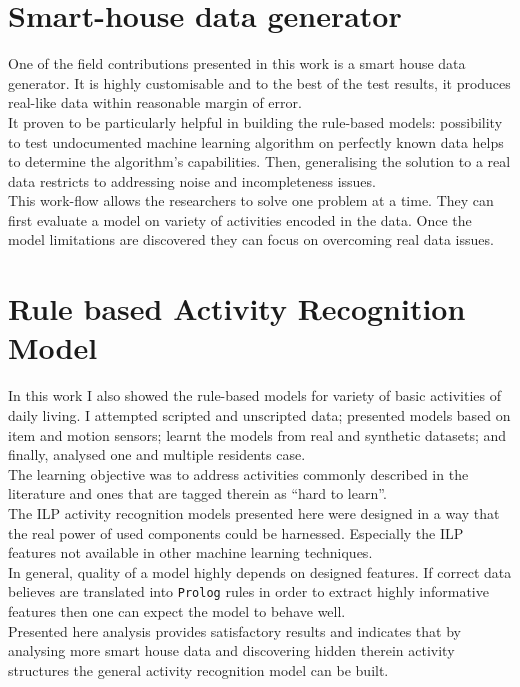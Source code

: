 \documentclass[10pt, a4paper, pdflatex, leqno, twoside, openright]{report}
\begin{document}
  \section{Smart-house data generator} %
One of the field contributions presented in this work is a smart house data generator. It is highly customisable and to the best of the test results, it produces real-like data within reasonable margin of error.\\
It proven to be particularly helpful in building the rule-based models: possibility to test undocumented machine learning algorithm on perfectly known data helps to determine the algorithm's capabilities. Then, generalising the solution to a real data restricts to addressing noise and incompleteness issues.\\
This work-flow allows the researchers to solve one problem at a time. They can first evaluate a model on variety of activities encoded in the data. Once the model limitations are discovered they can focus on overcoming real data issues.

  \section{Rule based Activity Recognition Model}
In this work I also showed the rule-based models for variety of basic activities of daily living. I attempted scripted and unscripted data; presented models based on item and motion sensors; learnt the models from real and synthetic datasets; and finally, analysed one and multiple residents case.\\
The learning objective was to address activities commonly described in the literature and ones that are tagged therein as ``hard to learn''.\\

The ILP activity recognition models presented here were designed in a way that the real power of used components could be harnessed. Especially the ILP features not available in other machine learning techniques.\\
In general, quality of a model highly depends on designed features. If correct data believes are translated into \texttt{Prolog} rules in order to extract highly informative features then one can expect the model to behave well.\\
Presented here analysis provides satisfactory results and indicates that by analysing more smart house data and discovering hidden therein activity structures the general activity recognition model can be built.
\end{document}
